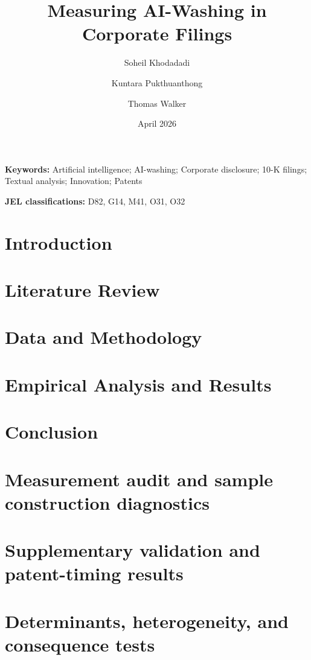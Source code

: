 \documentclass[11pt]{article}
\title{Measuring AI-Washing in Corporate Filings}
\author{Soheil Khodadadi \and Kuntara Pukthuanthong \and Thomas Walker}
\date{April 2026}
\begin{document}
\maketitle

\begin{abstract}

\end{abstract}

\noindent\textbf{Keywords:} Artificial intelligence; AI-washing; Corporate disclosure; 10-K filings; Textual analysis; Innovation; Patents

\noindent\textbf{JEL classifications:} D82, G14, M41, O31, O32

\section{Introduction}


\section{Literature Review}


\section{Data and Methodology}


\section{Empirical Analysis and Results}


\section{Conclusion}


\appendix

\renewcommand{\thesection}{Appendix \Alph{section}}
\renewcommand{\thetable}{\Alph{section}\arabic{table}}
\renewcommand{\thefigure}{\Alph{section}\arabic{figure}}

\clearpage
\section{Measurement audit and sample construction diagnostics}


\clearpage
\section{Supplementary validation and patent-timing results}


\clearpage
\section{Determinants, heterogeneity, and consequence tests}


\clearpage

\end{document}
